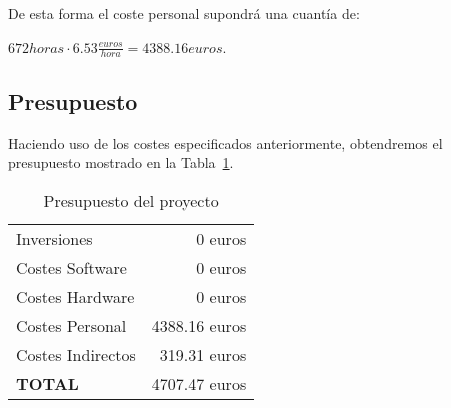 De esta forma el coste personal supondrá una cuantía de:
    
\begin{center}
$672 horas \cdot 6.53 \frac{euros}{hora} = 4388.16 euros$.
\end{center}

\subsection{Presupuesto}
    
Haciendo uso de los costes especificados anteriormente, obtendremos el presupuesto mostrado en la Tabla~\ref{tab:presup}.

\begin{table}
    \centering
        \begin{tabular}{|p{7cm}|r|}
        \hline
        Inversiones & 0 euros \\
        Costes Software & 0 euros \\
        Costes Hardware & 0 euros \\
        Costes Personal & 4388.16 euros \\
        Costes Indirectos & 319.31 euros \\ \hline  
        \textbf{TOTAL} & 4707.47 euros \\   
        \hline  
        \end{tabular}
    \caption{Presupuesto del proyecto}
    \label{tab:presup}
\end{table}
